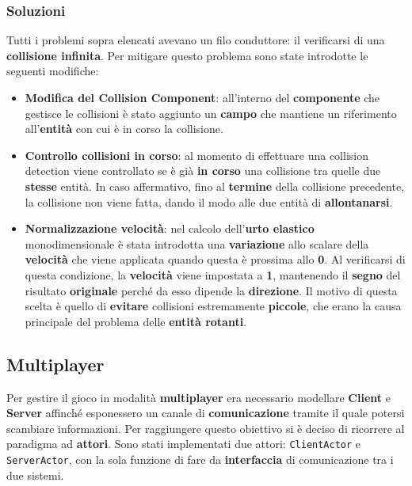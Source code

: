 \subsubsection{Soluzioni}
Tutti i problemi sopra elencati avevano un filo conduttore: il verificarsi di una \textbf{collisione infinita}. Per mitigare questo problema sono state introdotte le seguenti modifiche:
\begin{itemize}
    \item \textbf{Modifica del Collision Component}: all'interno del \textbf{componente} che gestisce le collisioni è stato aggiunto un \textbf{campo} che mantiene un riferimento all'\textbf{entità} con cui è in corso la collisione.

    \item \textbf{Controllo collisioni in corso}: al momento di effettuare una collision detection\textbf{} viene controllato se è già \textbf{in corso} una collisione tra quelle due \textbf{stesse} entità. In caso affermativo, fino al \textbf{termine} della collisione precedente, la collisione non viene fatta, dando il modo alle due entità di \textbf{allontanarsi}.
    
    \item \textbf{Normalizzazione velocità}: nel calcolo dell'\textbf{urto elastico} monodimensionale è stata introdotta una \textbf{variazione} allo scalare della \textbf{velocità} che viene applicata quando questa è prossima allo \textbf{0}. Al verificarsi di questa condizione, la \textbf{velocità} viene impostata a \textbf{1}, mantenendo il \textbf{segno} del risultato \textbf{originale} perché da esso dipende la \textbf{direzione}. Il motivo di questa scelta è quello di \textbf{evitare} collisioni estremamente \textbf{piccole}, che erano la causa principale del problema delle \textbf{entità rotanti}.
\end{itemize}

\subsection{Multiplayer}
Per gestire il gioco in modalità \textbf{multiplayer} era necessario modellare \textbf{Client} e \textbf{Server} affinché esponessero un canale di \textbf{comunicazione} tramite il quale potersi scambiare informazioni.
Per raggiungere questo obiettivo si è deciso di ricorrere al paradigma ad \textbf{
attori}. 
Sono stati implementati due attori: \texttt{ClientActor} e \texttt{ServerActor}, con la sola funzione di fare da \textbf{interfaccia} di comunicazione tra i due sistemi. 

